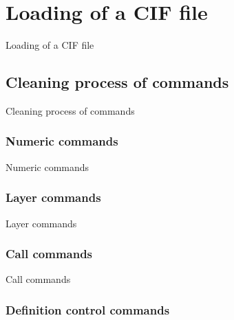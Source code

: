 \documentclass[11pt,twoside,openany,x11names,svgnames]{memoir}
\begin{document}
\section{Loading of a CIF file}\label{Loading-of-a-CIF-file}

Loading of a CIF file

\subsection{Cleaning process of commands}\label{Cleaning-process-of-commands}

Cleaning process of commands

\subsubsection{Numeric commands}\label{Numeric-commands}

Numeric commands

\subsubsection{Layer commands}\label{Layer-commands}

Layer commands

\subsubsection{Call commands}\label{Call-commands}

Call commands

\subsubsection{Definition control commands}\label{Definition-control-commands}
\end{document}
